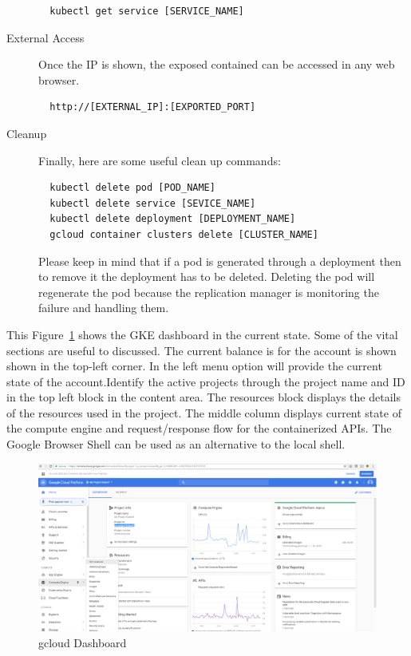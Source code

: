\begin{description}
\begin{verbatim}
  kubectl get service [SERVICE_NAME]
\end{verbatim}

\item [External Access] Once the IP is shown, the exposed contained can be
accessed in any web browser.
\begin{verbatim}
  http://[EXTERNAL_IP]:[EXPORTED_PORT]
\end{verbatim}

\item [Cleanup] Finally, here are some useful clean up commands:
\begin{verbatim}
  kubectl delete pod [POD_NAME]
  kubectl delete service [SEVICE_NAME]
  kubectl delete deployment [DEPLOYMENT_NAME]
  gcloud container clusters delete [CLUSTER_NAME]
\end{verbatim}

  Please keep in mind that if a pod is generated through a deployment then to
  remove it the deployment has to be deleted. Deleting the pod will regenerate
  the pod because the replication manager is monitoring the failure and
  handling them.

\end{description}


This Figure~\ref{fig:gcloud-dashboard} shows the GKE dashboard in the current
state. Some of the vital sections are useful to discussed. The current balance
is for the account is shown shown in the top-left corner. In the left menu
option will provide the current state of the account.Identify the active
projects through the project name and ID in the top left block in the content
area. The resources block displays the details of the resources used in the
project. The middle column displays current state of the compute engine and
request/response flow for the containerized APIs. The Google Browser Shell can
be used as an alternative to the local shell.



\begin{figure}[htb]
 \centering\includegraphics[width=\columnwidth]{images/hid_417_gcloud_browser.png}
 \caption{gcloud Dashboard}\label{fig:gcloud-dashboard}
\end{figure}

